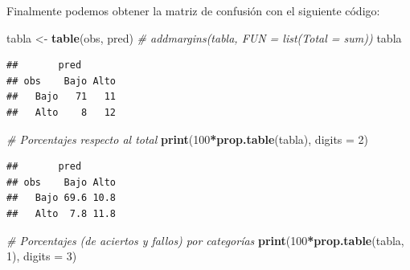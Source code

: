 \documentclass[]{book}
\newenvironment{Shaded}{\begin{snugshade}}{\end{snugshade}}
\newcommand{\KeywordTok}[1]{\textcolor[rgb]{0.13,0.29,0.53}{\textbf{#1}}}
\newcommand{\DataTypeTok}[1]{\textcolor[rgb]{0.13,0.29,0.53}{#1}}
\newcommand{\DecValTok}[1]{\textcolor[rgb]{0.00,0.00,0.81}{#1}}
\newcommand{\FloatTok}[1]{\textcolor[rgb]{0.00,0.00,0.81}{#1}}
\newcommand{\StringTok}[1]{\textcolor[rgb]{0.31,0.60,0.02}{#1}}
\newcommand{\CommentTok}[1]{\textcolor[rgb]{0.56,0.35,0.01}{\textit{#1}}}
\newcommand{\OperatorTok}[1]{\textcolor[rgb]{0.81,0.36,0.00}{\textbf{#1}}}
\newcommand{\NormalTok}[1]{#1}
\theoremstyle{break}
\theoremstyle{definition}
\theoremstyle{definition}
\theoremstyle{definition}
\theoremstyle{remark}
\begin{document}
\begin{Shaded}
\end{Shaded}

Finalmente podemos obtener la matriz de confusión con el siguiente
código:

\begin{Shaded}
\begin{Highlighting}[]
\NormalTok{tabla <-}\StringTok{ }\KeywordTok{table}\NormalTok{(obs, pred)}
\CommentTok{# addmargins(tabla, FUN = list(Total = sum))}
\NormalTok{tabla}
\end{Highlighting}
\end{Shaded}

\begin{verbatim}
##       pred
## obs    Bajo Alto
##   Bajo   71   11
##   Alto    8   12
\end{verbatim}

\begin{Shaded}
\begin{Highlighting}[]
\CommentTok{# Porcentajes respecto al total}
\KeywordTok{print}\NormalTok{(}\DecValTok{100}\OperatorTok{*}\KeywordTok{prop.table}\NormalTok{(tabla), }\DataTypeTok{digits =} \DecValTok{2}\NormalTok{) }
\end{Highlighting}
\end{Shaded}

\begin{verbatim}
##       pred
## obs    Bajo Alto
##   Bajo 69.6 10.8
##   Alto  7.8 11.8
\end{verbatim}

\begin{Shaded}
\begin{Highlighting}[]
\CommentTok{# Porcentajes (de aciertos y fallos) por categorías}
\KeywordTok{print}\NormalTok{(}\DecValTok{100}\OperatorTok{*}\KeywordTok{prop.table}\NormalTok{(tabla, }\DecValTok{1}\NormalTok{), }\DataTypeTok{digits =} \DecValTok{3}\NormalTok{) }
\end{Highlighting}
\end{Shaded}
\end{document}
